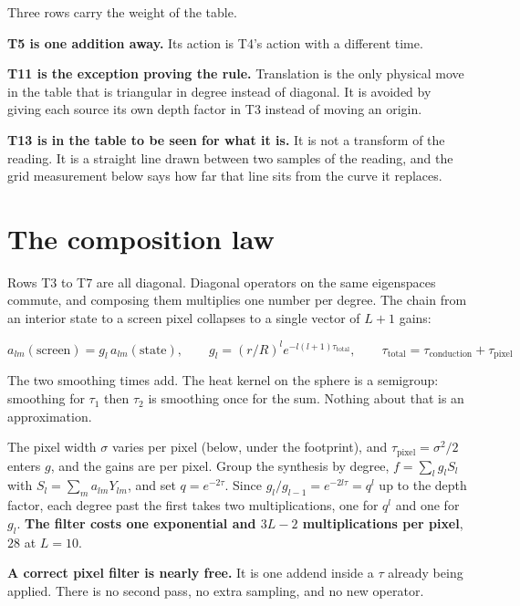Three rows carry the weight of the table.

\textbf{T5 is one addition away.} Its action is T4's action with a different time.

\textbf{T11 is the exception proving the rule.} Translation is the only physical move in the table that is triangular in degree instead of diagonal. It is avoided by giving each source its own depth factor in T3 instead of moving an origin.

\textbf{T13 is in the table to be seen for what it is.} It is not a transform of the reading. It is a straight line drawn between two samples of the reading, and the grid measurement below says how far that line sits from the curve it replaces.

\section{The composition law}

Rows T3 to T7 are all diagonal. Diagonal operators on the same eigenspaces commute, and composing them multiplies one number per degree. The chain from an interior state to a screen pixel collapses to a single vector of \(L+1\) gains:

\begin{center}
\(a_{lm}(\text{screen}) = g_l\, a_{lm}(\text{state}), \qquad g_l = (r/R)^l e^{-l(l+1)\tau_{\text{total}}}, \qquad \tau_{\text{total}} = \tau_{\text{conduction}} + \tau_{\text{pixel}}\)
\end{center}

The two smoothing times add. The heat kernel on the sphere is a semigroup: smoothing for \(\tau_1\) then \(\tau_2\) is smoothing once for the sum. Nothing about that is an approximation.

The pixel width \(\sigma\) varies per pixel (below, under the footprint), and \(\tau_{\text{pixel}} = \sigma^2/2\) enters \(g\), and the gains are per pixel. Group the synthesis by degree, \(f = \sum_l g_l S_l\) with \(S_l = \sum_m a_{lm} Y_{lm}\), and set \(q = e^{-2\tau}\). Since \(g_l / g_{l-1} = e^{-2l\tau} = q^l\) up to the depth factor, each degree past the first takes two multiplications, one for \(q^l\) and one for \(g_l\). \textbf{The filter costs one exponential and \(3L - 2\) multiplications per pixel}, \(28\) at \(L = 10\).

\textbf{A correct pixel filter is nearly free.} It is one addend inside a \(\tau\) already being applied. There is no second pass, no extra sampling, and no new operator.

